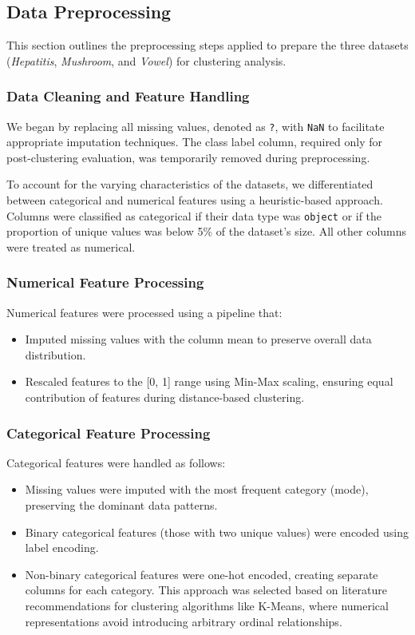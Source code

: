 \subsection{Data Preprocessing}
\label{subsec:preprocessing}

This section outlines the preprocessing steps applied to prepare the three datasets (\textit{Hepatitis}, \textit{Mushroom}, and \textit{Vowel}) for clustering analysis.

\subsubsection{Data Cleaning and Feature Handling} 
We began by replacing all missing values, denoted as \texttt{?}, with \texttt{NaN} to facilitate appropriate imputation techniques. The class label column, required only for post-clustering evaluation, was temporarily removed during preprocessing.

To account for the varying characteristics of the datasets, we differentiated between categorical and numerical features using a heuristic-based approach. Columns were classified as categorical if their data type was \texttt{object} or if the proportion of unique values was below 5\% of the dataset's size. All other columns were treated as numerical.

\subsubsection{Numerical Feature Processing}
Numerical features were processed using a pipeline that:
\begin{itemize}
    \item Imputed missing values with the column mean to preserve overall data distribution.
    \item Rescaled features to the [0, 1] range using Min-Max scaling, ensuring equal contribution of features during distance-based clustering.
\end{itemize}

\subsubsection{Categorical Feature Processing}
Categorical features were handled as follows:
\begin{itemize}
    \item Missing values were imputed with the most frequent category (mode), preserving the dominant data patterns.
    \item Binary categorical features (those with two unique values) were encoded using label encoding.
    \item Non-binary categorical features were one-hot encoded, creating separate columns for each category. This approach was selected based on literature recommendations for clustering algorithms like K-Means, where numerical representations avoid introducing arbitrary ordinal relationships.
\end{itemize}

